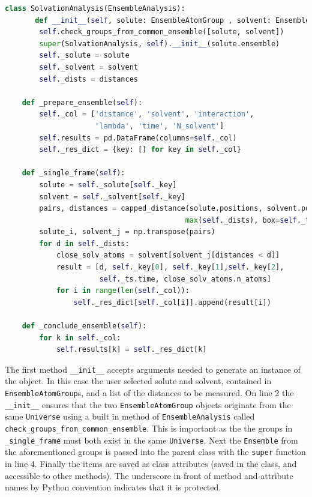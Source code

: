 \documentclass{article}[letterpaper, margins=1in, 12pt]
\begin{document}
\begin{lstlisting}[language=Python]
class SolvationAnalysis(EnsembleAnalysis):
       def __init__(self, solute: EnsembleAtomGroup , solvent: EnsembleAtomGroup , distances: List[float]):
        self.check_groups_from_common_ensemble([solute, solvent])
        super(SolvationAnalysis, self).__init__(solute.ensemble)
        self._solute = solute
        self._solvent = solvent
        self._dists = distances

    def _prepare_ensemble(self):
        self._col = ['distance', 'solvent', 'interaction',
                     'lambda', 'time', 'N_solvent']
        self.results = pd.DataFrame(columns=self._col)
        self._res_dict = {key: [] for key in self._col}

    def _single_frame(self):
        solute = self._solute[self._key]
        solvent = self._solvent[self._key]
        pairs, distances = capped_distance(solute.positions, solvent.positions,
                                          max(self._dists), box=self._ts.dimensions)
        solute_i, solvent_j = np.transpose(pairs)
        for d in self._dists:
            close_solv_atoms = solvent[solvent_j[distances < d]]
            result = [d, self._key[0], self._key[1],self._key[2],
                      self._ts.time, close_solv_atoms.n_atoms]
            for i in range(len(self._col)):
                self._res_dict[self._col[i]].append(result[i])

    def _conclude_ensemble(self):
        for k in self._col:
            self.results[k] = self._res_dict[k]
\end{lstlisting}

The first method \lstinline{__init__} accepts arguments needed to generate an instance of the object. In this case the user selected solute and solvent, contained in \texttt{EnsembleAtomGroup}s, and a list of the distances to be measured. On line 2 the \lstinline{__init__} ensures that the two \texttt{EnsembleAtomGroup} objects originate from the same \texttt{Universe} using a built in method of \texttt{EnsembleAnalysis} called \lstinline{check_groups_from_common_ensemble}. This is important as the the groups in \lstinline{_single_frame} must both exist in the same \texttt{Universe}. Next the \texttt{Ensemble} from the aforementioned groups is passed into the parent class with the \lstinline{super} function in line 4. Finally the items are saved as class attributes (saved in the class, and accessible to other methods). The underscore in front of method and attribute names by Python convention indicates that it is protected.
\end{document}
